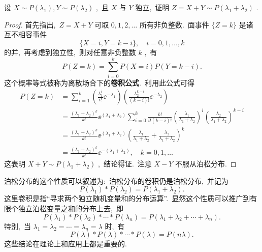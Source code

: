    \begin{example}[(泊松分布的可加性)]\label{exam:3.3.2}
   	设 $X\sim P(\lambda_{1}),Y\sim P(\lambda_2)$ ,\ 且 $X$ 与 $Y$ 独立,\ 证明 $Z=X+Y\sim P(\lambda_{1}+\lambda_{2})$ .
   	\begin{proof}
   		首先指出,\ $Z=X+Y$ 可取 $0,1,2,\ldots$ 所有非负整数.\ 面事件 $\{Z=k\}$ 是诸互不相容事件
   		\begin{equation*}
   			\{X=i,Y=k-i\},\quad i=0,1,\ldots,k
   		\end{equation*}
   		的并,\ 再考虑到独立性,\ 则对任意非负整数 $k$ ,\ 有
   		\begin{equation}
   			P(Z=k)=\sum_{i=0}^{k}P(X=i)P(Y=k-i).\label{eq:3.3.1}
   		\end{equation}
   		这个概率等式被称为离散场合下的{\bfseries 卷积公式}.\ 利用此公式可得
   		\begin{align*}
   			P(Z=k) &=\sum_{i=1}^{k}\left(\frac{\lambda_{1}^i}{i!}\ee^{-\lambda_{1}}\right)\left(\frac{\lambda_2^{k-i}}{(k-i)!}\ee^{-\lambda_{2}}\right)\\
   			&=\frac{(\lambda_{1}+\lambda_{2})^k}{k!}\ee^{(\lambda_{1}+\lambda_{2})}\sum_{i=0}^{k}\frac{k!}{i!(k-i)!}\left(\frac{\lambda_{1}}{\lambda_{1}+\lambda_{2}}\right)^i\left(\frac{\lambda_{2}}{\lambda_{1}+\lambda_{2}}\right)^{k-i}\\
   			&=\frac{(\lambda_{1}+\lambda_{2})^k}{k!}\ee^{(\lambda_{1}+\lambda_{2})}\left(\frac{\lambda_{1}}{\lambda_{1}+\lambda_{2}}+\frac{\lambda_{2}}{\lambda_{1}+\lambda_{2}}\right)^k\\
   			&=\frac{(\lambda_{1}+\lambda_{2})^k}{k!}\ee^{-(\lambda_{1}+\lambda_{2})},\quad k=0,1,\ldots
   		\end{align*}
   		这表明 $X+Y\sim P(\lambda_{1}+\lambda_{2})$ ,\ 结论得证.\ 注意 $X-Y$ 不服从泊松分布.
   	\end{proof}
   \end{example}
   泊松分布的这个性质可以叙述为:\ 泊松分布的卷积仍是泊松分布,\ 并记为
   \begin{equation}
   	P(\lambda_{1})\ast P(\lambda_{2})=P(\lambda_{1}+\lambda_{2}).\label{eq:3.3.2}
   \end{equation}
   这里卷积是指“寻求两个独立随机变量和的分布运算”.\ 显然这个性质可以推广到有限个独立泊松变量之和的分布上去,\ 即
   \begin{equation}
   	P(\lambda_{1})\ast P(\lambda_{2})\ast \cdots\ast P(\lambda_n)=P(\lambda_{1}+\lambda_{2}+\cdots+\lambda_n).\label{eq:3.3.3}
   \end{equation}
   特别,\ 当 $\lambda_{1}=\lambda_{2}=\cdots=\lambda_n=\lambda$ 时,\ 有
   \begin{equation}
   	P(\lambda)\ast P(\lambda)\ast\cdots\ast P(\lambda)=P(n\lambda).\label{eq:3.3.4}
   \end{equation}
   这些结论在理论上和应用上都是重要的.
   

